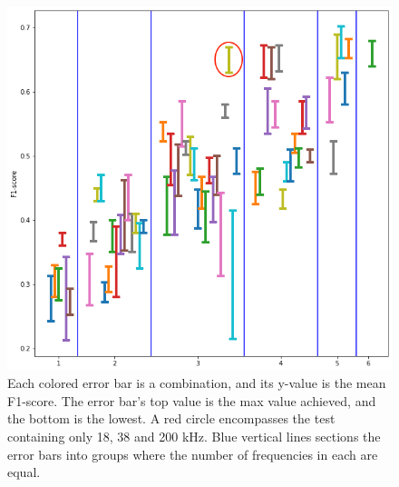         \begin{figure}[H]
            \centering
            \includegraphics[scale=0.7]{figures/error_bar.png}
            \caption[Error bar - combinations of 3 frequencies]{Each colored error bar is a combination, and its y-value is the mean F1-score. The error bar's top value is the max value achieved, and the bottom is the lowest. A red circle encompasses the test containing only 18, 38 and 200 kHz. Blue vertical lines sections the error bars into groups where the number of frequencies in each are equal.}
          	\medskip 
            \label{errorbar_fig}
        \end{figure}
        
        
        
